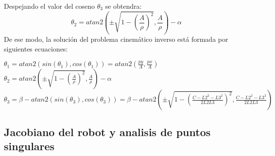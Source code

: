 	Despejando el valor del coseno $\theta_{3}$ se obtendra:
	\begin{equation}
	\theta_{2}=atan2(\pm \sqrt{1-(\frac{A}{\rho})^{2}},\frac{A}{\rho})-\alpha
	\end{equation}
	De ese modo, la solución del problema cinemático inverso está formada por siguientes ecuaciones:
	\begin{center}
		$\theta_{1}=atan2(sin(\theta_{1}),cos(\theta_{1}))=atan2(\frac{py}{A},\frac{px}{A})$ \\
		$\theta_{2}=atan2(\pm \sqrt{1-(\frac{A}{\rho})^{2}},\frac{A}{\rho})-\alpha$ \\
		$\theta_{3}=\beta -atan2(sin(\theta_{3}),cos(\theta_{3}))=\beta-atan2(\pm \sqrt{1-(\frac{C-L2^{2}-L3^{2}}{2L2L3})^{2}},\frac{C-L2^{2}-L3^{2}}{2L2L3} )$
	\end{center}
	\subsection{Jacobiano del robot y analisis de puntos singulares}
